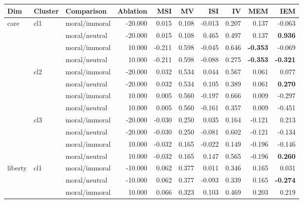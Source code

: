 \documentclass[runninghheads]{llncs}
\begin{document}
\begin{table}[!ht]
    \centering
    \begingroup
    \scriptsize
    \begin{tabular}{|l|l|l|r|r|r|r|r|r|r|}
    \hline
        \textbf{Dim} & \textbf{Cluster} & \textbf{Comparison} & \textbf{Ablation} & \textbf{MSI} & \textbf{MV} & \textbf{ISI} & \textbf{IV} & \textbf{MEM} & \textbf{IEM} \\ 
            \hline\hline
        \multirow{12}{*}{care} & \multirow{4}{*}{cl1} & moral/immoral & -20.000 & 0.015 & 0.108 & -0.013 & 0.207 & 0.137 & -0.063 \\ 
        & & moral/neutral & -20.000 & 0.015 & 0.108 & 0.465 & 0.497 & 0.137 & \textbf{0.936} \\
        & & moral/immoral & 10.000 & -0.211 & 0.598 & -0.045 & 0.646 & \textbf{-0.353} & -0.069 \\
        & & moral/neutral & 10.000 & -0.211 & 0.598 & -0.088 & 0.275 & \textbf{-0.353} & \textbf{-0.321} \\ 
         \cline{2-10}
        & \multirow{4}{*}{cl2} & moral/immoral & -20.000 & 0.032 & 0.534 & 0.044 & 0.567 & 0.061 & 0.077 \\
        &  & moral/neutral & -20.000 & 0.032 & 0.534 & 0.105 & 0.389 & 0.061 & \textbf{0.270} \\ 
        &  & moral/immoral & 10.000 & 0.005 & 0.560 & -0.197 & 0.666 & 0.009 & -0.297 \\ 
        &  & moral/neutral & 10.000 & 0.005 & 0.560 & -0.161 & 0.357 & 0.009 & -0.451 \\ 
         \cline{2-10}
        & \multirow{4}{*}{cl3} & moral/immoral & -20.000 & -0.030 & 0.250 & 0.035 & 0.164 & -0.121 & 0.213 \\ 
        &  & moral/neutral & -20.000 & -0.030 & 0.250 & -0.081 & 0.602 & -0.121 & -0.134 \\ 
        &  & moral/immoral & 10.000 & -0.032 & 0.165 & -0.022 & 0.149 & -0.196 & -0.146 \\ 
        &  & moral/neutral & 10.000 & -0.032 & 0.165 & 0.147 & 0.565 & -0.196 & \textbf{0.260} \\
        \hline\hline
        \multirow{12}{*}{liberty} & \multirow{4}{*}{cl1} & moral/immoral & -10.000 & 0.062 & 0.377 & 0.011 & 0.346 & 0.165 & 0.031 \\ 
         &  & moral/neutral & -10.000 & 0.062 & 0.377 & -0.093 & 0.339 & 0.165 & \textbf{-0.274} \\ 
         &  & moral/immoral & 10.000 & 0.066 & 0.323 & 0.103 & 0.469 & 0.203 & 0.219 \\ 

\end{tabular}
\end{table}
\end{document}
